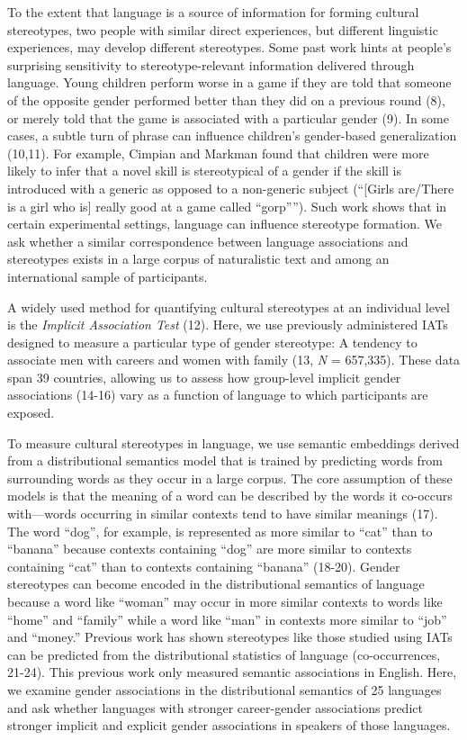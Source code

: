 \documentclass[9pt,twocolumn]{pnas-new}
\begin{document}
To the extent that language is a source of information for forming
cultural stereotypes, two people with similar direct experiences, but
different linguistic experiences, may develop different stereotypes.
Some past work hints at people's surprising sensitivity to
stereotype-relevant information delivered through language. Young
children perform worse in a game if they are told that someone of the
opposite gender performed better than they did on a previous round
(8), or merely told that the game is associated
with a particular gender (9). In some
cases, a subtle turn of phrase can influence children's gender-based
generalization (10,11). For example, Cimpian and Markman found that children were more likely to infer that a novel skill is stereotypical of a
gender if the skill is introduced with a generic as opposed to a
non-generic subject (``{[}Girls are/There is a girl who is{]} really
good at a game called ``gorp''''). Such work shows that in certain
experimental settings, language can influence stereotype formation. We ask whether a similar correspondence between language associations and stereotypes exists in a large corpus of naturalistic text and among an international sample of participants. 

A widely used method for quantifying cultural stereotypes at an
individual level is the \emph{Implicit Association Test} (12). Here, we use previously administered IATs designed to measure a particular type of gender
stereotype: A tendency to associate men with careers and women with family
(13, \emph{N} = 657,335). These data span 39 countries, allowing us to assess how group-level implicit gender associations (14-16) vary as a function of language to which participants are exposed. 

To measure cultural stereotypes in language, we use semantic embeddings derived from a distributional semantics model that is trained by predicting words from surrounding words as they occur in a large corpus. The core assumption of these models is that the meaning of a word can be described by the words it co-occurs with---words occurring in similar contexts tend to have similar meanings (17). The word \enquote{dog}, for example, is represented as more similar to \enquote{cat} than to \enquote{banana} because contexts containing \enquote{dog} are more similar to contexts containing \enquote{cat} than to contexts containing \enquote{banana} (18-20). Gender stereotypes can become encoded in the distributional semantics of language because a word like \enquote{woman} may occur in more similar contexts to words like \enquote{home} and \enquote{family} while a word like \enquote{man} in contexts more similar to \enquote{job} and \enquote{money.} Previous work has shown stereotypes like those studied using IATs can be predicted from the distributional statistics of language (co-occurrences, 21-24). This previous work only measured semantic associations in English. Here, we examine gender associations in the distributional semantics of 25 languages and ask whether languages with stronger career-gender associations predict stronger implicit and explicit gender associations in speakers of those languages.
\end{document}
